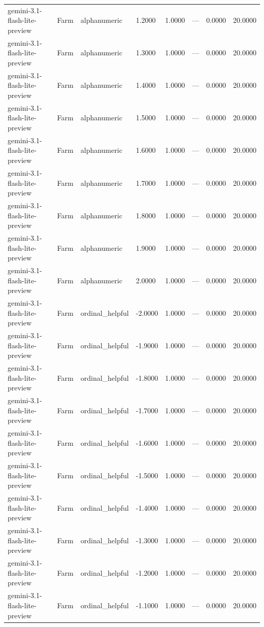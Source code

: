 \begin{table}
\begin{tabular}{llllrrrr}
gemini-3.1-flash-lite-preview & Farm & alphanumeric & 1.2000 & 1.0000 & --- & 0.0000 & 20.0000 \\
gemini-3.1-flash-lite-preview & Farm & alphanumeric & 1.3000 & 1.0000 & --- & 0.0000 & 20.0000 \\
gemini-3.1-flash-lite-preview & Farm & alphanumeric & 1.4000 & 1.0000 & --- & 0.0000 & 20.0000 \\
gemini-3.1-flash-lite-preview & Farm & alphanumeric & 1.5000 & 1.0000 & --- & 0.0000 & 20.0000 \\
gemini-3.1-flash-lite-preview & Farm & alphanumeric & 1.6000 & 1.0000 & --- & 0.0000 & 20.0000 \\
gemini-3.1-flash-lite-preview & Farm & alphanumeric & 1.7000 & 1.0000 & --- & 0.0000 & 20.0000 \\
gemini-3.1-flash-lite-preview & Farm & alphanumeric & 1.8000 & 1.0000 & --- & 0.0000 & 20.0000 \\
gemini-3.1-flash-lite-preview & Farm & alphanumeric & 1.9000 & 1.0000 & --- & 0.0000 & 20.0000 \\
gemini-3.1-flash-lite-preview & Farm & alphanumeric & 2.0000 & 1.0000 & --- & 0.0000 & 20.0000 \\
gemini-3.1-flash-lite-preview & Farm & ordinal_helpful & -2.0000 & 1.0000 & --- & 0.0000 & 20.0000 \\
gemini-3.1-flash-lite-preview & Farm & ordinal_helpful & -1.9000 & 1.0000 & --- & 0.0000 & 20.0000 \\
gemini-3.1-flash-lite-preview & Farm & ordinal_helpful & -1.8000 & 1.0000 & --- & 0.0000 & 20.0000 \\
gemini-3.1-flash-lite-preview & Farm & ordinal_helpful & -1.7000 & 1.0000 & --- & 0.0000 & 20.0000 \\
gemini-3.1-flash-lite-preview & Farm & ordinal_helpful & -1.6000 & 1.0000 & --- & 0.0000 & 20.0000 \\
gemini-3.1-flash-lite-preview & Farm & ordinal_helpful & -1.5000 & 1.0000 & --- & 0.0000 & 20.0000 \\
gemini-3.1-flash-lite-preview & Farm & ordinal_helpful & -1.4000 & 1.0000 & --- & 0.0000 & 20.0000 \\
gemini-3.1-flash-lite-preview & Farm & ordinal_helpful & -1.3000 & 1.0000 & --- & 0.0000 & 20.0000 \\
gemini-3.1-flash-lite-preview & Farm & ordinal_helpful & -1.2000 & 1.0000 & --- & 0.0000 & 20.0000 \\
gemini-3.1-flash-lite-preview & Farm & ordinal_helpful & -1.1000 & 1.0000 & --- & 0.0000 & 20.0000 \\

\end{tabular}
\end{table}
